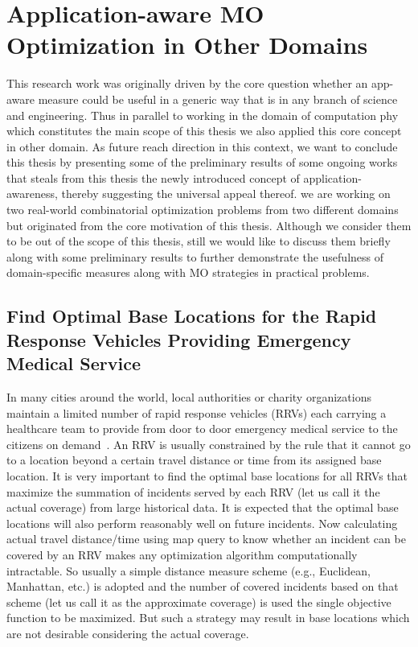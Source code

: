 \section{Application-aware MO Optimization in Other Domains}
This research work was originally driven by the core question whether an app-aware measure could be useful in a generic way that is in any branch of science and engineering. Thus in parallel to working in the domain of computation phy which constitutes the main scope of this thesis we also applied this core concept in other domain. 
As future reach direction in this context, we want to conclude this thesis by presenting some of the preliminary results of some ongoing works that steals from this thesis the newly introduced concept of application-awareness, thereby suggesting the universal appeal thereof.
 we are working on two real-world combinatorial optimization problems from two different domains but originated from the core motivation of this thesis. Although we consider them to be out of the scope of this thesis, still we would like to discuss them briefly along with some preliminary results to further demonstrate the usefulness of domain-specific measures along with MO strategies in practical problems. 

\subsection{Find Optimal Base Locations for the Rapid Response Vehicles Providing Emergency Medical Service}
In many cities around the world, local authorities or charity organizations maintain a limited number of rapid response vehicles (RRVs) each carrying a healthcare team to provide from door to door emergency medical service to the citizens on demand~\cite{roislien2018comparing, van2019improving, benabdouallah2017comparison}. An RRV is usually constrained by the rule that it cannot go to a location beyond a certain travel distance or time from its assigned base location. It is very important to find the optimal base locations for all RRVs that maximize the summation of incidents served by each RRV (let us call it the actual coverage) from large historical data. It is expected that the optimal base locations will also perform reasonably well on future incidents. Now calculating actual travel distance/time using map query to know whether an incident can be covered by an RRV makes any optimization algorithm computationally intractable. So usually a simple distance measure scheme (e.g., Euclidean, Manhattan, etc.) is adopted and the number of covered incidents based on that scheme (let us call it as the approximate coverage) is used the single objective function to be maximized. But such a strategy may result in base locations which are not desirable considering the actual coverage.

